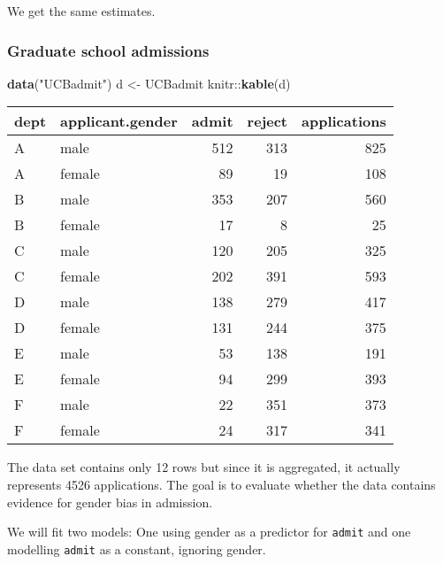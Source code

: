 \documentclass[]{tufte-handout}
\newenvironment{Shaded}{}{}
\newcommand{\KeywordTok}[1]{\textcolor[rgb]{0.00,0.44,0.13}{\textbf{#1}}}
\newcommand{\StringTok}[1]{\textcolor[rgb]{0.25,0.44,0.63}{#1}}
\newcommand{\OperatorTok}[1]{\textcolor[rgb]{0.40,0.40,0.40}{#1}}
\newcommand{\NormalTok}[1]{#1}
\begin{document}
We get the same estimates.

\subsubsection{Graduate school
admissions}\label{graduate-school-admissions}

\begin{Shaded}
\begin{Highlighting}[]
\KeywordTok{data}\NormalTok{(}\StringTok{"UCBadmit"}\NormalTok{)}
\NormalTok{d <-}\StringTok{ }\NormalTok{UCBadmit}
\NormalTok{knitr}\OperatorTok{::}\KeywordTok{kable}\NormalTok{(d)}
\end{Highlighting}
\end{Shaded}

\begin{longtable}[]{@{}llrrr@{}}
\toprule
dept & applicant.gender & admit & reject & applications\tabularnewline
\midrule
\endhead
A & male & 512 & 313 & 825\tabularnewline
A & female & 89 & 19 & 108\tabularnewline
B & male & 353 & 207 & 560\tabularnewline
B & female & 17 & 8 & 25\tabularnewline
C & male & 120 & 205 & 325\tabularnewline
C & female & 202 & 391 & 593\tabularnewline
D & male & 138 & 279 & 417\tabularnewline
D & female & 131 & 244 & 375\tabularnewline
E & male & 53 & 138 & 191\tabularnewline
E & female & 94 & 299 & 393\tabularnewline
F & male & 22 & 351 & 373\tabularnewline
F & female & 24 & 317 & 341\tabularnewline
\bottomrule
\end{longtable}

The data set contains only 12 rows but since it is aggregated, it
actually represents 4526 applications. The goal is to evaluate whether
the data contains evidence for gender bias in admission.

We will fit two models: One using gender as a predictor for
\texttt{admit} and one modelling \texttt{admit} as a constant, ignoring
gender.
\end{document}
